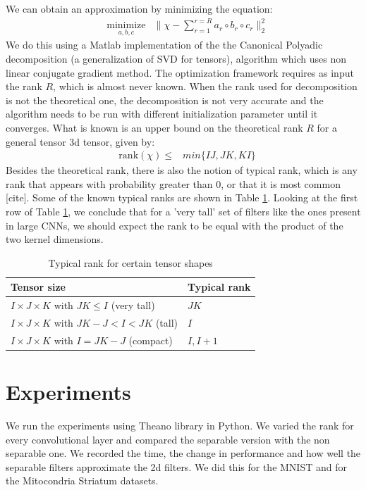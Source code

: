 \documentclass{article} %
\begin{document}
We can obtain an approximation by minimizing the equation:
\begin{equation*}
\begin{aligned}
& \underset{a,b,c}{\text{minimize}}
& \| \chi - \sum_{r=1}^{r=R}{a_{r}\circ b_{r}\circ c_{r}} \|_{2}^{2} 
\end{aligned}
\end{equation*}
We do this using a Matlab implementation of the the Canonical Polyadic decomposition (a generalization of  SVD for tensors),  algorithm which uses non linear conjugate gradient method. The optimization framework requires as input the rank $R$, which is almost never known. When the rank used for decomposition is not the theoretical one, the decomposition is not very accurate and the algorithm needs to be run with different initialization parameter until it converges.
What is known is an upper bound on the theoretical rank $R$ for a  general tensor 3d tensor, given by:
 \begin{equation*}
\begin{aligned}
& \text{rank}(\chi) \leq 
& min{\{IJ, JK, KI\}}
\end{aligned}
\end{equation*} 
Besides the theoretical rank, there is also the notion of typical rank, which is any rank
that appears with probability greater than 0, or that it is most common [cite].
Some of the known typical ranks are shown in Table \ref{table:rank}.
Looking at the first row of Table \ref{table:rank}, we conclude that for a 'very tall' set of filters like the ones present in large CNNs, 
we should expect the rank to be equal with the product of the two kernel dimensions.
 \begin{table}
\centering
\begin{tabular}{@{}ll@{}}\toprule
Tensor size & Typical rank \\ \midrule
$I \times J \times K$ with $JK \leq I$ (very tall) & $JK$\\
$I \times J \times K$ with $JK - J < I < JK$ (tall) & $I$ \\
$I \times J \times K$ with $I = JK - J$ (compact) & $I, I+1$  \\ \bottomrule
\end{tabular}
\caption{Typical rank for certain tensor shapes}
\label{table:rank}
\end{table}

\section{Experiments}
We run the experiments using Theano library in Python. 
We varied the rank for every convolutional layer and compared the separable version with the non separable one. We recorded the time, the change in performance and how well the separable filters approximate the 2d filters. We did this for the MNIST and for the
Mitocondria Striatum datasets.
\end{document}
